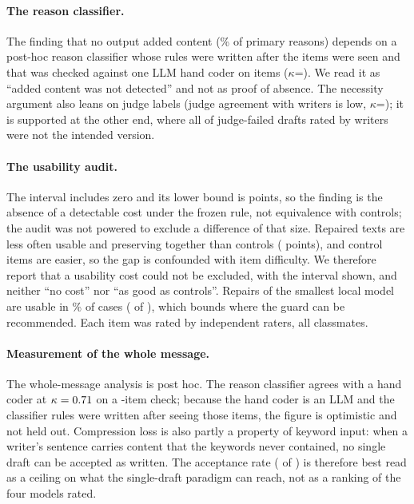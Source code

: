 \paragraph{The reason classifier.}
The finding that no output added content (\jmwmAdded{}\% of primary reasons) depends on a post-hoc reason classifier whose rules were written after the items were seen and that was checked against one LLM hand coder on \jmwmHandN{} items (\ensuremath{\kappa}=\jmwmHandKappa{}). We read it as ``added content was not detected'' and not as proof of absence. %
The necessity argument also leans on judge labels (judge agreement with writers is low, \ensuremath{\kappa}=\jmpOneEightKappa{}); it is supported at the other end, where all \jmwmWrongNotIntK{} of \jmwmWrongNotIntN{} judge-failed drafts rated by writers were not the intended version.

\paragraph{The usability audit.}
The interval includes zero and its lower bound is \jmpOneSevenDiffUsableLo{} points, so the finding is the absence of a detectable cost under the frozen rule, not equivalence with controls; the audit was not powered to exclude a difference of that size.
Repaired texts are less often usable and preserving together than controls (\jmpOneSevenDiffUsPres{} points), and control items are easier, so the gap is confounded with item difficulty.
We therefore report that a usability cost could not be excluded, with the interval shown, and neither ``no cost'' nor ``as good as controls''.
Repairs of the smallest local model are usable in \jmpOneSevenGemmaUsable{}\% of cases (\jmpOneSevenGemmaUsableK{} of \jmpOneSevenGemmaUsableN{}), which bounds where the guard can be recommended.
Each item was rated by \jmdesignRatersPerItem{} independent raters, all classmates.

\paragraph{Measurement of the whole message.}
The whole-message analysis is post hoc.
The reason classifier agrees with a hand coder at $\kappa=0.71{}$ on a \jmwmHandN{}-item check; because the hand coder is an LLM and the classifier rules were written after seeing those items, the figure is optimistic and not held out.
Compression loss is also partly a property of keyword input: when a writer's sentence carries content that the keywords never contained, no single draft can be accepted as written.
The acceptance rate (\jmpOneEightAcceptYesK{} of \jmpOneEightAcceptN{}) is therefore best read as a ceiling on what the single-draft paradigm can reach, not as a ranking of the four models rated.


